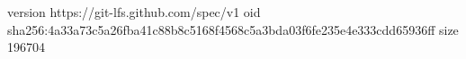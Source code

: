 version https://git-lfs.github.com/spec/v1
oid sha256:4a33a73c5a26fba41c88b8c5168f4568c5a3bda03f6fe235e4e333cdd65936ff
size 196704
